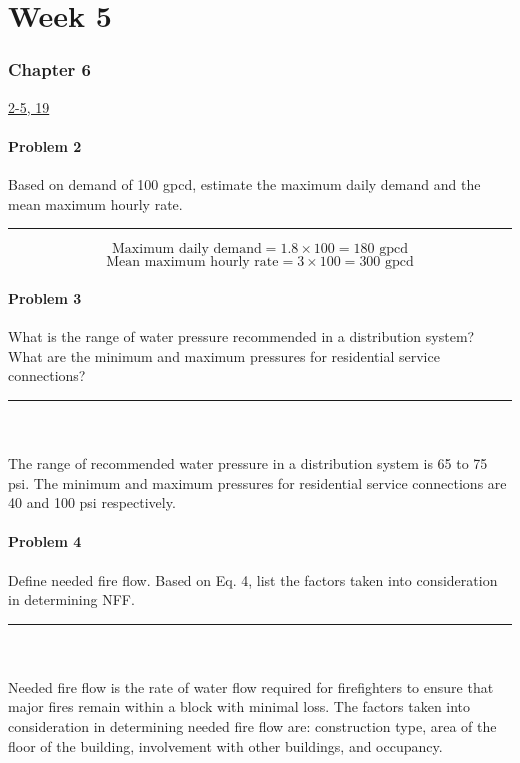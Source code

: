\part*{Week 5}
\section*{Chapter 6}
\underline{2-5, 19}
\subsection*{Problem 2}
Based on demand of 100 gpcd, estimate the maximum daily demand and the mean maximum hourly rate.
\\\rule{5cm}{1pt}
\[\text{Maximum daily demand}=1.8\times100=\boxed{180\text{ gpcd}}\]
\[\text{Mean maximum hourly rate}=3\times100=\boxed{300\text{ gpcd}}\]
\subsection*{Problem 3}
What is the range of water pressure recommended in a distribution system? What are the minimum and maximum pressures for residential service connections?
\\\rule{5cm}{1pt}
\\\\The range of recommended water pressure in a distribution system is 65 to 75 psi. The minimum and maximum pressures for residential service connections are 40 and 100 psi respectively.
\subsection*{Problem 4}
Define needed fire flow. Based on Eq. 4, list the factors taken into consideration in determining NFF.
\\\rule{5cm}{1pt}
\\\\Needed fire flow is the rate of water flow required for firefighters to ensure that major fires remain within a block with minimal loss. The factors taken into consideration in determining needed fire flow are: construction type, area of the floor of the building, involvement with other buildings, and occupancy.
